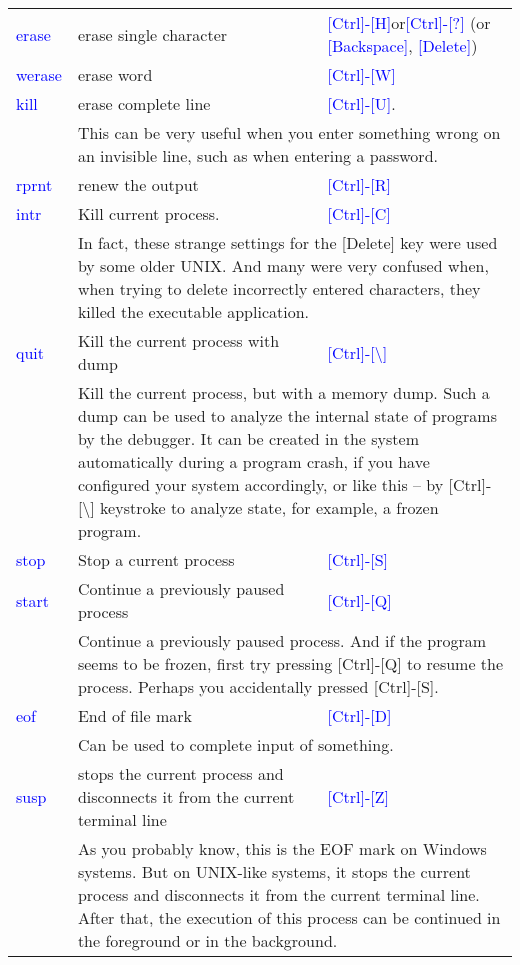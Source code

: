 \documentclass[12pt]{report}
\newcommand{\struct}[1]{\textcolor{blue}{#1}}
\begin{document}
\medskip
\noindent
\begin{tabular}{lp{}p{}}
\struct{erase} &erase single character&\struct{[Ctrl]-[H]}\hspace{0.6em}or\hspace{0.6em}\struct{[Ctrl]-[?]}
(or \struct{[Backspace]}, \struct{[Delete]})\\
\struct{werase}&erase word &\struct{[Ctrl]-[W]}\\
\struct{kill}  &erase complete line&\struct{[Ctrl]-[U]}.\\
&\multicolumn{2}{p{0.87\textwidth}}{This can be very useful when
you enter something wrong on an invisible line, such as when entering
a password.}\\
\struct{rprnt} &renew the output&\struct{[Ctrl]-[R]}\\
\struct{intr}  &Kill current process.&\struct{[Ctrl]-[C]}\\
&\multicolumn{2}{p{0.87\textwidth}}{In fact, these strange settings for
the [Delete] key were used by some older UNIX. And many were very confused when,
when trying to delete incorrectly entered characters,
they killed the executable application.}\\
\struct{quit}  &Kill the current process with dump&\struct{[Ctrl]-[\textbackslash]}\\
&\multicolumn{2}{p{0.87\textwidth}}{Kill the current process, but with
a memory dump. Such a dump can be used to analyze the internal state of
programs by the debugger. It can be created in the system automatically during
a program crash, if you have configured your system accordingly, or like this --
by [Ctrl]-[\textbackslash] keystroke to analyze state, for example,
a frozen program.}\\
\struct{stop}  &Stop a current process&\struct{[Ctrl]-[S]}\\
\struct{start} &Continue a previously paused process&\struct{[Ctrl]-[Q]}\\
&\multicolumn{2}{p{0.87\textwidth}}{Continue a previously paused process.
And if the program seems to be frozen, first try pressing [Ctrl]-[Q] to resume
the process. Perhaps you accidentally pressed [Ctrl]-[S].}\\
\struct{eof}   &End of file mark&\struct{[Ctrl]-[D]}\\
&\multicolumn{2}{p{0.87\textwidth}}{Can be used to complete input of something.}\\
\struct{susp}  &stops the current process and disconnects
it from the current terminal line&\struct{[Ctrl]-[Z]}\\
&\multicolumn{2}{p{0.87\textwidth}}{As you probably know, this is the EOF mark
on Windows systems. But on UNIX-like systems, it stops the current process and
disconnects it from the current terminal line. After that, the execution of
this process can be continued in the foreground or in the background.}
\end{tabular}
\end{document}
